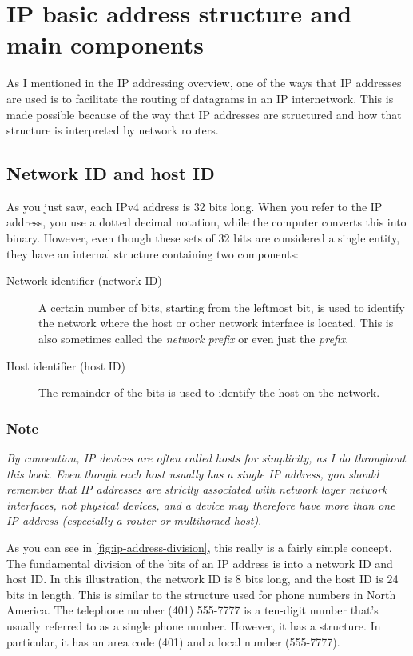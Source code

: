 \documentclass[b5paper,11pt]{memoir}
\begin{document}
\section{IP basic address structure and main components}

As I mentioned in the IP addressing overview, one of the ways that IP
addresses are used is to facilitate the routing of datagrams in an IP
internetwork. This is made possible because of the way that IP addresses
are structured and how that structure is interpreted by network routers.



\subsection{Network ID and host ID}

As you just saw, each IPv4 address is 32 bits long.
When you refer to the IP address, you use a dotted decimal notation, while the computer converts
this into binary. However, even though these sets of 32 bits are
considered a single entity, they have an internal structure containing
two components:
\begin{description}
   \item[Network identifier (network ID)]
      A certain number of bits, starting from the leftmost bit, is used to identify the network where the host or other network interface is located. This is also sometimes called the \emph{network prefix} or even just the \emph{prefix}.
   \item[Host identifier (host ID)]
      The remainder of the bits is used to identify the host on the network.
\end{description}

\subsubsection[Note]{\texorpdfstring{\protect\hypertarget{ch16s03.htmlux5cux23note-62}{}{}Note}{Note}}

{\emph{By convention, IP devices are often called hosts for simplicity,
as I do throughout this book. Even though each host usually has a single
IP address, you should remember that IP addresses are strictly
associated with network layer network interfaces, not physical devices,
and a device may therefore have more than one IP address (especially a
router or multihomed host)}}.

As you can see in \cref{fig:ip-address-division},
this really is a fairly simple concept. The fundamental division of the
bits of an IP address is into a network ID and host ID. In this
illustration, the network ID is 8 bits long, and the host ID is 24 bits
in length. This is similar to the structure used for phone numbers in
North America. The telephone number (401) 555-7777 is a ten-digit number
that's usually referred to as a single phone number. However, it has a
structure. In particular, it has an area code (401) and a local number
(555-7777).
\end{document}
